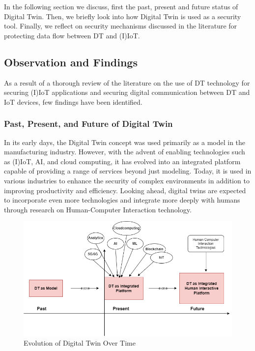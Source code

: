 In the following section we discuss, first the past, present and future status of Digital Twin. Then, we briefly look into how Digital Twin is used as a security tool. Finally, we reflect on security mechanisms discussed in the literature for protecting data flow between DT and (I)IoT.

\subsection{Observation and Findings}
As a result of a thorough review of the literature on the use of DT technology for securing (I)IoT applications and securing digital communication between DT and IoT devices, few findings have been identified.


\subsubsection{Past, Present, and Future of Digital Twin}
In its early days, the Digital Twin concept was used primarily as a model in the manufacturing industry. However, with the advent of enabling technologies such as (I)IoT, AI, and cloud computing, it has evolved into an integrated platform capable of providing a range of services beyond just modeling. Today, it is used in various industries to enhance the security of complex environments in addition to improving productivity and efficiency. Looking ahead, digital twins are expected to incorporate even more technologies and integrate more deeply with humans through research on Human-Computer Interaction technology. 

\begin{figure}[H]
    \centering
    \includegraphics[width=\textwidth]{images/rt/dt-evolution.drawio.png}
    \caption{Evolution of Digital Twin Over Time}
    \label{fig:dt-evol}
\end{figure}


